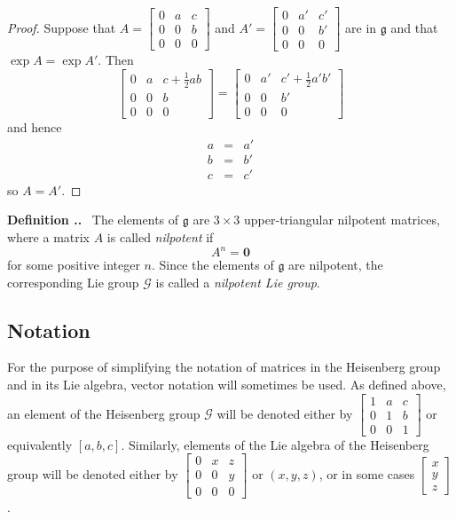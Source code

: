 \documentclass[honours]{UNSWthesis}
\newcommand{\G}{\mathcal{G}}
\newcommand{\g}{\mathfrak{g}}
\newcommand{\1}{\mathbf{e}_{1}}
\newcommand{\2}{\mathbf{e}_{3}}
\newcommand{\3}{\mathbf{e}_{3}}
\newcounter{Item}[section]
\newenvironment{Definition}{\medskip
                            \refstepcounter{Item}
                            \noindent
                           {\bf Definition \thesection.\theItem.}\ }
                           {\medskip}
\begin{document}
\begin{proof}
Suppose that $A=\begin{bmatrix} 0 & a & c \\ 0 & 0 & b \\ 0 & 0 & 0 \end{bmatrix}$ and $A'=\begin{bmatrix} 0 & a' & c' \\ 0 & 0 & b' \\ 0 & 0 & 0 \end{bmatrix}$ are in $\g$ and that $\exp{A}=\exp{A'}$. Then 
\[
\begin{bmatrix} 0 & a & c+\frac{1}{2}ab \\ 0 & 0 & b \\ 0 & 0 & 0 \end{bmatrix} =\begin{bmatrix} 0 & a' & c' +\frac{1}{2}a' b' \\ 0 & 0 & b' \\ 0 & 0 & 0 \end{bmatrix}
\] 
and hence
\begin{eqnarray*}
a &=& a' \\
b &=& b' \\
c &=& c'
\end{eqnarray*}
so $A=A'$.
\end{proof}

\begin{Definition}
The elements of $\g$ are $3 \times 3$ upper-triangular nilpotent matrices, where a matrix $A$ is called \emph{nilpotent} if 
\[
A^{n}=\mathbf{0}
\]
for some positive integer $n$. Since the elements of $\g$ are nilpotent, the corresponding Lie group $\G$ is called a \emph{nilpotent Lie group}.
\end{Definition}

\subsection*{Notation}
For the purpose of simplifying the notation of matrices in the Heisenberg group and in its Lie algebra, vector notation will sometimes be used. As defined above, an element of the Heisenberg group $\G$ will be denoted either by $ \begin{bmatrix} 1 & a & c \\ 0 & 1 & b \\ 0 & 0 & 1 \end{bmatrix} $ or equivalently $[a,b,c]$. Similarly, elements of the Lie algebra of the Heisenberg group will be denoted either by $\begin{bmatrix} 0 & x & z \\ 0 & 0 & y \\ 0 & 0 & 0 \end{bmatrix}$ or $(x,y,z)$, or in some cases $\begin{bmatrix} x \\ y \\ z \end{bmatrix}$.
\end{document}
